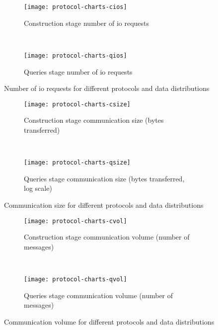 \begin{figure*}[ht!]
	\captionsetup[subfigure]{justification=centering}
	\centering
	\begin{subfigure}[t]{0.5\textwidth}
		\centering
		\texttt{[image: protocol-charts-cios]}
		\caption{Construction stage number of \acrshort{io} requests}%
		\label{figure:protocols-ios:c}
	\end{subfigure}%
	~ %
	\begin{subfigure}[t]{0.5\textwidth}
		\centering
		\texttt{[image: protocol-charts-qios]}
		\caption{Queries stage number of \acrshort{io} requests}%
		\label{figure:protocols-ios:q}
	\end{subfigure}%
	\caption{Number of \acrshort{io} requests for different protocols and data distributions}%
	\label{figure:protocols-ios}
\end{figure*}

\begin{figure*}[ht!]
	\captionsetup[subfigure]{justification=centering}
	\centering
	\begin{subfigure}[t]{0.5\textwidth}
		\centering
		\texttt{[image: protocol-charts-csize]}
		\caption{Construction stage communication size (bytes transferred)}%
		\label{figure:protocols-size:c}
	\end{subfigure}%
	~ %
	\begin{subfigure}[t]{0.5\textwidth}
		\centering
		\texttt{[image: protocol-charts-qsize]}
		\caption{Queries stage communication size (bytes transferred, log scale)}%
		\label{figure:protocols-size:q}
	\end{subfigure}%
	\caption{Communication size for different protocols and data distributions}%
	\label{figure:protocols-size}
\end{figure*}

\begin{figure*}[ht!]
	\captionsetup[subfigure]{justification=centering}
	\centering
	\begin{subfigure}[t]{0.5\textwidth}
		\centering
		\texttt{[image: protocol-charts-cvol]}
		\caption{Construction stage communication volume (number of messages)}%
		\label{figure:protocols-vol:c}
	\end{subfigure}%
	~ %
	\begin{subfigure}[t]{0.5\textwidth}
		\centering
		\texttt{[image: protocol-charts-qvol]}
		\caption{Queries stage communication volume (number of messages)}%
		\label{figure:protocols-vol:q}
	\end{subfigure}%
	\caption{Communication volume for different protocols and data distributions}%
	\label{figure:protocols-vol}
\end{figure*}
